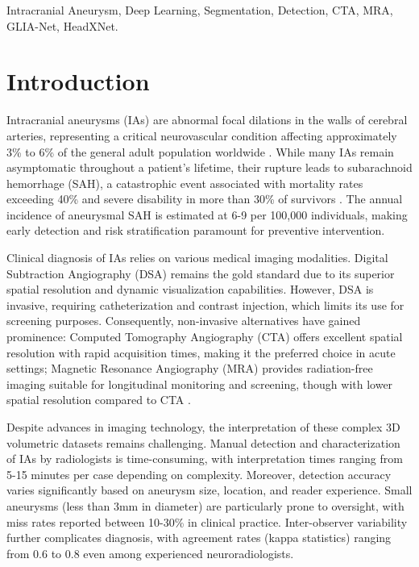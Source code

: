 \documentclass[conference]{IEEEtran}
\begin{document}
\begin{IEEEkeywords}
Intracranial Aneurysm, Deep Learning, Segmentation, Detection, CTA, MRA, GLIA-Net, HeadXNet.
\end{IEEEkeywords}

\section{Introduction}

Intracranial aneurysms (IAs) are abnormal focal dilations in the walls of cerebral arteries, representing a critical neurovascular condition affecting approximately 3\% to 6\% of the general adult population worldwide \cite{bo2021toward}. While many IAs remain asymptomatic throughout a patient's lifetime, their rupture leads to subarachnoid hemorrhage (SAH), a catastrophic event associated with mortality rates exceeding 40\% and severe disability in more than 30\% of survivors \cite{ueda2019deep}. The annual incidence of aneurysmal SAH is estimated at 6-9 per 100,000 individuals, making early detection and risk stratification paramount for preventive intervention.

Clinical diagnosis of IAs relies on various medical imaging modalities. Digital Subtraction Angiography (DSA) remains the gold standard due to its superior spatial resolution and dynamic visualization capabilities. However, DSA is invasive, requiring catheterization and contrast injection, which limits its use for screening purposes. Consequently, non-invasive alternatives have gained prominence: Computed Tomography Angiography (CTA) offers excellent spatial resolution with rapid acquisition times, making it the preferred choice in acute settings; Magnetic Resonance Angiography (MRA) provides radiation-free imaging suitable for longitudinal monitoring and screening, though with lower spatial resolution compared to CTA \cite{park2019headxnet}.

Despite advances in imaging technology, the interpretation of these complex 3D volumetric datasets remains challenging. Manual detection and characterization of IAs by radiologists is time-consuming, with interpretation times ranging from 5-15 minutes per case depending on complexity. Moreover, detection accuracy varies significantly based on aneurysm size, location, and reader experience. Small aneurysms (less than 3mm in diameter) are particularly prone to oversight, with miss rates reported between 10-30\% in clinical practice. Inter-observer variability further complicates diagnosis, with agreement rates (kappa statistics) ranging from 0.6 to 0.8 even among experienced neuroradiologists.
\end{document}
